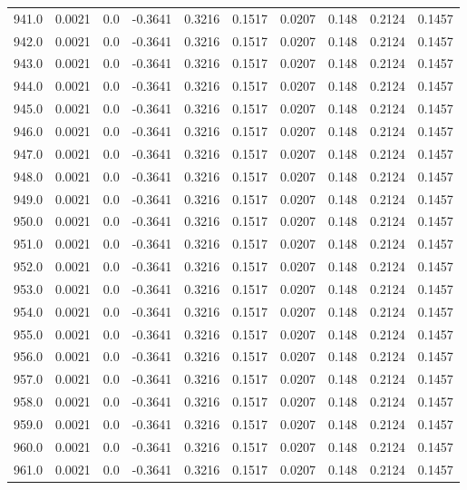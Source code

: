 \begin{longtable}{lrrrrrrrrr}
941.0 & 0.0021 & 0.0 & -0.3641 & 0.3216 & 0.1517 & 0.0207 & 0.148 & 0.2124 & 0.1457 \\
942.0 & 0.0021 & 0.0 & -0.3641 & 0.3216 & 0.1517 & 0.0207 & 0.148 & 0.2124 & 0.1457 \\
943.0 & 0.0021 & 0.0 & -0.3641 & 0.3216 & 0.1517 & 0.0207 & 0.148 & 0.2124 & 0.1457 \\
944.0 & 0.0021 & 0.0 & -0.3641 & 0.3216 & 0.1517 & 0.0207 & 0.148 & 0.2124 & 0.1457 \\
945.0 & 0.0021 & 0.0 & -0.3641 & 0.3216 & 0.1517 & 0.0207 & 0.148 & 0.2124 & 0.1457 \\
946.0 & 0.0021 & 0.0 & -0.3641 & 0.3216 & 0.1517 & 0.0207 & 0.148 & 0.2124 & 0.1457 \\
947.0 & 0.0021 & 0.0 & -0.3641 & 0.3216 & 0.1517 & 0.0207 & 0.148 & 0.2124 & 0.1457 \\
948.0 & 0.0021 & 0.0 & -0.3641 & 0.3216 & 0.1517 & 0.0207 & 0.148 & 0.2124 & 0.1457 \\
949.0 & 0.0021 & 0.0 & -0.3641 & 0.3216 & 0.1517 & 0.0207 & 0.148 & 0.2124 & 0.1457 \\
950.0 & 0.0021 & 0.0 & -0.3641 & 0.3216 & 0.1517 & 0.0207 & 0.148 & 0.2124 & 0.1457 \\
951.0 & 0.0021 & 0.0 & -0.3641 & 0.3216 & 0.1517 & 0.0207 & 0.148 & 0.2124 & 0.1457 \\
952.0 & 0.0021 & 0.0 & -0.3641 & 0.3216 & 0.1517 & 0.0207 & 0.148 & 0.2124 & 0.1457 \\
953.0 & 0.0021 & 0.0 & -0.3641 & 0.3216 & 0.1517 & 0.0207 & 0.148 & 0.2124 & 0.1457 \\
954.0 & 0.0021 & 0.0 & -0.3641 & 0.3216 & 0.1517 & 0.0207 & 0.148 & 0.2124 & 0.1457 \\
955.0 & 0.0021 & 0.0 & -0.3641 & 0.3216 & 0.1517 & 0.0207 & 0.148 & 0.2124 & 0.1457 \\
956.0 & 0.0021 & 0.0 & -0.3641 & 0.3216 & 0.1517 & 0.0207 & 0.148 & 0.2124 & 0.1457 \\
957.0 & 0.0021 & 0.0 & -0.3641 & 0.3216 & 0.1517 & 0.0207 & 0.148 & 0.2124 & 0.1457 \\
958.0 & 0.0021 & 0.0 & -0.3641 & 0.3216 & 0.1517 & 0.0207 & 0.148 & 0.2124 & 0.1457 \\
959.0 & 0.0021 & 0.0 & -0.3641 & 0.3216 & 0.1517 & 0.0207 & 0.148 & 0.2124 & 0.1457 \\
960.0 & 0.0021 & 0.0 & -0.3641 & 0.3216 & 0.1517 & 0.0207 & 0.148 & 0.2124 & 0.1457 \\
961.0 & 0.0021 & 0.0 & -0.3641 & 0.3216 & 0.1517 & 0.0207 & 0.148 & 0.2124 & 0.1457 \\

\end{longtable}

